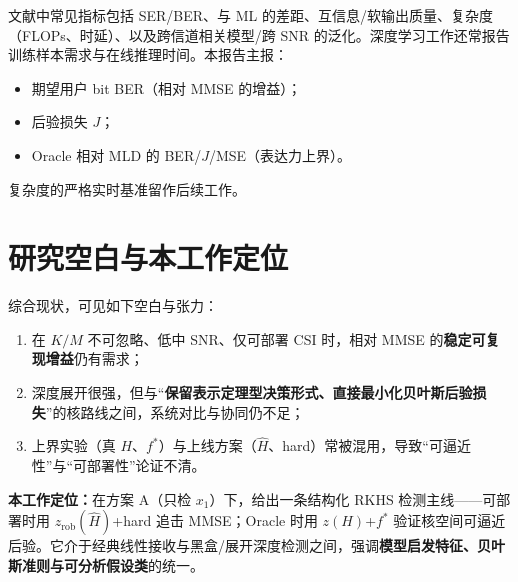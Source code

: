文献中常见指标包括 SER/BER、与 ML 的差距、互信息/软输出质量、复杂度（FLOPs、时延）、以及跨信道相关模型/跨 SNR 的泛化。深度学习工作还常报告训练样本需求与在线推理时间。本报告主报：
\begin{itemize}
  \item 期望用户 bit BER（相对 MMSE 的增益）；
  \item 后验损失 $J$；
  \item Oracle 相对 MLD 的 BER/$J$/MSE（表达力上界）。
\end{itemize}
复杂度的严格实时基准留作后续工作。

\section{研究空白与本工作定位}

综合现状，可见如下空白与张力：
\begin{enumerate}[leftmargin=2em]
  \item 在 $K/M$ 不可忽略、低中 SNR、仅可部署 CSI 时，相对 MMSE 的\textbf{稳定可复现增益}仍有需求；
  \item 深度展开很强，但与“\textbf{保留表示定理型决策形式、直接最小化贝叶斯后验损失}”的核路线之间，系统对比与协同仍不足；
  \item 上界实验（真 $H$、$f^*$）与上线方案（$\hat H$、hard）常被混用，导致“可逼近性”与“可部署性”论证不清。
\end{enumerate}

\noindent\textbf{本工作定位：}在方案 A（只检 $x_1$）下，给出一条结构化 RKHS 检测主线——可部署时用 $z_{\mathrm{rob}}(\hat H)$+hard 追击 MMSE；Oracle 时用 $z(H)$+$f^*$ 验证核空间可逼近后验。它介于经典线性接收与黑盒/展开深度检测之间，强调\textbf{模型启发特征、贝叶斯准则与可分析假设类}的统一。
